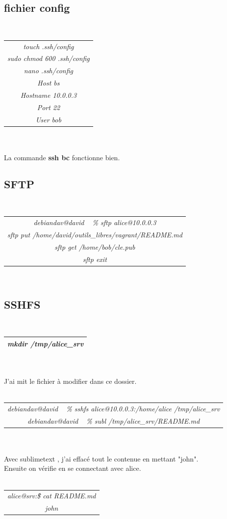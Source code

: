 \documentclass{report}
\begin{document}
\subsection{fichier config}
\\
\begin{tabular}{|c|}
\hline
\textit{touch .ssh/config} \\ 
\textit{sudo chmod 600 .ssh/config} \\
\textit{nano .ssh/config} \\
\hline
\textit{Host bs} \\
\textit{Hostname 10.0.0.3} \\
\textit{Port 22} \\
\textit{User bob} \\
\hline
\end{tabular}
\\
\\
La commande \textbf{ssh bc} fonctionne bien.

\subsection{SFTP}
\\
\begin{tabular}{|c|}
\hline
\textit{debiandav@david ~ \% sftp alice@10.0.0.3} \\
\textit{sftp\> put /home/david/outils\_libres/vagrant/README.md} \\
\textit{sftp\> get /home/bob/cle.pub} \\
\textit{sftp\> exit} \\
\hline
\end{tabular}
\\
\subsection{SSHFS}
\\
\begin{tabular}{|c|}
\hline
\textit{mkdir /tmp/alice\_srv} \\
\hline
\end{tabular}
\\
\\
J'ai mit le fichier à modifier dans ce dossier. \\
\\
\begin{tabular}{|c|}
\hline
\textit{debiandav@david ~ \% sshfs alice@10.0.0.3:/home/alice /tmp/alice\_srv} \\
\textit{debiandav@david ~ \% subl /tmp/alice\_srv/README.md} \\
\hline
\end{tabular}
\\
\\
Avec sublimetext , j'ai effacé tout le contenue en mettant "john". \\
Ensuite on vérifie en se connectant avec alice. \\
\\
\begin{tabular}{|c|}
\hline
\textit{alice@srv:\~\$ cat README.md} \\
\textit{john} \\
\hline
\end{tabular}
\\
\end{document}
